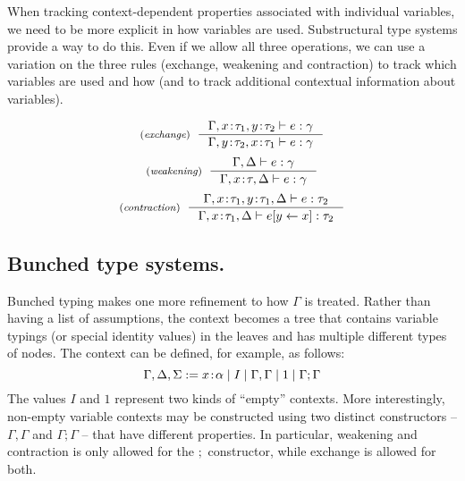 When tracking context-dependent properties associated with individual variables, we need to 
be more explicit in how variables are used. Substructural type systems provide a way to do this.
Even if we allow all three operations, we can use a variation on the three rules (exchange, 
weakening and contraction) to track which variables are used and how (and to track additional 
contextual information about variables). 

\begin{figure}
\begin{equation*}
\tyrule{exchange}
  {\Gamma, x\!:\!\tau_1, y\!:\!\tau_2 \vdash e : \gamma}
  {\Gamma, y\!:\!\tau_2, x\!:\!\tau_1 \vdash e : \gamma}
\end{equation*}
\begin{equation*}
\tyrule{weakening}
  {\Gamma, \Delta \vdash e : \gamma}
  {\Gamma, x\!:\!\tau, \Delta \vdash e : \gamma}
\end{equation*}
\begin{equation*}
\tyrule{contraction}
  {\Gamma, x\!:\!\tau_1, y\!:\!\tau_1, \Delta \vdash e : \tau_2}
  {\Gamma, x\!:\!\tau_1, \Delta \vdash \subst{e}{y}{x} : \tau_2}
\end{equation*}

\label{fig:substructural-rules}
\end{figure}


\subsection{Bunched type systems.}
Bunched typing makes one more refinement to how $\Gamma$ is treated. Rather than having a list
of assumptions, the context becomes a tree that contains variable typings (or special identity
values) in the leaves and has multiple different types of nodes. The context can be defined,
for example, as follows:
%
\begin{equation*}
\Gamma, \Delta, \Sigma := x\!:\!\alpha \; | \; I \; | \; \Gamma, \Gamma \; | \; 1 \; | \; \Gamma; \Gamma
\end{equation*}
%
The values $I$ and $1$ represent two kinds of ``empty'' contexts. More interestingly, non-empty
variable contexts may be constructed using two distinct constructors -- $\Gamma, \Gamma$ and 
$\Gamma; \Gamma$ -- that have different properties. In particular, weakening and contraction is
only allowed for the $;$ constructor, while exchange is allowed for both.  

